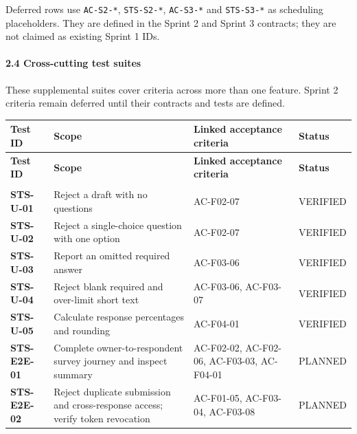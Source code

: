 \documentclass[12pt,a4paper]{article}
\begin{document}
Deferred rows use \texttt{AC-S2-*}, \texttt{STS-S2-*}, \texttt{AC-S3-*} and \texttt{STS-S3-*} as scheduling placeholders. They are defined in the Sprint 2 and Sprint 3 contracts; they are not claimed as existing Sprint 1 IDs.

\paragraph*{2.4 Cross-cutting test suites}
These supplemental suites cover criteria across more than one feature. Sprint 2 criteria remain deferred until their contracts and tests are defined.

{\setlength{\tabcolsep}{3pt}\renewcommand{\arraystretch}{1.08}\small
\begin{longtable}{@{}>{\raggedright\arraybackslash}p{}>{\raggedright\arraybackslash}p{}>{\raggedright\arraybackslash}p{}>{\raggedright\arraybackslash}p{}@{}}
\toprule
\textbf{Test ID} & \textbf{Scope} & \textbf{Linked acceptance criteria} & \textbf{Status} \\
\midrule
\endfirsthead
\toprule
\textbf{Test ID} & \textbf{Scope} & \textbf{Linked acceptance criteria} & \textbf{Status} \\
\midrule
\endhead
\midrule
\multicolumn{4}{r}{\footnotesize\textit{Continued on next page}}\\
\endfoot
\bottomrule
\endlastfoot
\textbf{STS-U-01} & Reject a draft with no questions & AC-F02-07 & VERIFIED \\
\textbf{STS-U-02} & Reject a single-choice question with one option & AC-F02-07 & VERIFIED \\
\textbf{STS-U-03} & Report an omitted required answer & AC-F03-06 & VERIFIED \\
\textbf{STS-U-04} & Reject blank required and over-limit short text & AC-F03-06, AC-F03-07 & VERIFIED \\
\textbf{STS-U-05} & Calculate response percentages and rounding & AC-F04-01 & VERIFIED \\
\textbf{STS-E2E-01} & Complete owner-to-respondent survey journey and inspect summary & AC-F02-02, AC-F02-06, AC-F03-03, AC-F04-01 & PLANNED \\
\textbf{STS-E2E-02} & Reject duplicate submission and cross-response access; verify token revocation & AC-F01-05, AC-F03-04, AC-F03-08 & PLANNED \\
\end{longtable}}
\end{document}
